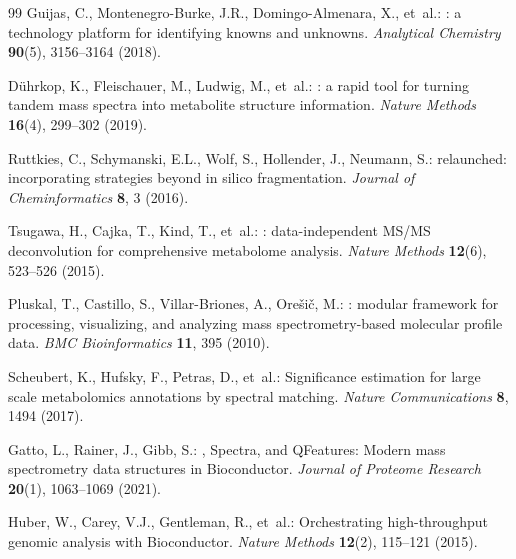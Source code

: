 \documentclass[11pt,twoside,openright]{book}
\begin{document}
\begin{thebibliography}{99}
Guijas, C., Montenegro-Burke, J.R., Domingo-Almenara, X., et~al.:
: a technology platform for identifying knowns and unknowns.
\newblock \emph{Analytical Chemistry} \textbf{90}(5), 3156--3164 (2018).
\newblock {}

D\"uhrkop, K., Fleischauer, M., Ludwig, M., et~al.:
: a rapid tool for turning tandem mass spectra into metabolite structure information.
\newblock \emph{Nature Methods} \textbf{16}(4), 299--302 (2019).
\newblock {}

Ruttkies, C., Schymanski, E.L., Wolf, S., Hollender, J., Neumann, S.:
 relaunched: incorporating strategies beyond in silico fragmentation.
\newblock \emph{Journal of Cheminformatics} \textbf{8}, 3 (2016).
\newblock {}

Tsugawa, H., Cajka, T., Kind, T., et~al.:
: data-independent {MS/MS} deconvolution for comprehensive metabolome analysis.
\newblock \emph{Nature Methods} \textbf{12}(6), 523--526 (2015).
\newblock {}

Pluskal, T., Castillo, S., Villar-Briones, A., Ore\v{s}i\v{c}, M.:
: modular framework for processing, visualizing, and analyzing mass spectrometry-based molecular profile data.
\newblock \emph{BMC Bioinformatics} \textbf{11}, 395 (2010).
\newblock {}

Scheubert, K., Hufsky, F., Petras, D., et~al.:
\newblock Significance estimation for large scale metabolomics annotations by spectral matching.
\newblock \emph{Nature Communications} \textbf{8}, 1494 (2017).
\newblock {}

Gatto, L., Rainer, J., Gibb, S.:
, {Spectra}, and {QFeatures}: Modern mass spectrometry data structures in {Bioconductor}.
\newblock \emph{Journal of Proteome Research} \textbf{20}(1), 1063--1069 (2021).
\newblock {}

Huber, W., Carey, V.J., Gentleman, R., et~al.:
\newblock Orchestrating high-throughput genomic analysis with {Bioconductor}.
\newblock \emph{Nature Methods} \textbf{12}(2), 115--121 (2015).
\newblock {}


\end{thebibliography}
\end{document}
